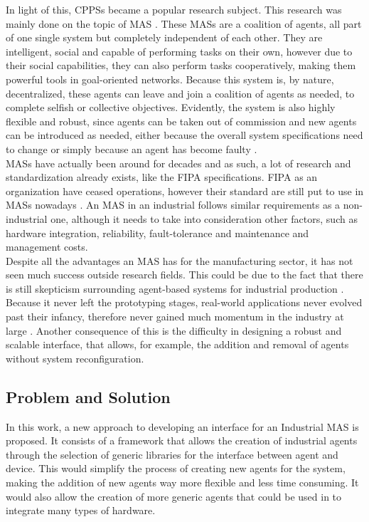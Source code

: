 In light of this, \gls{CPPS}s became a popular research subject. This research was mainly done on the topic of \gls{MAS} \cite{sakurada01} \cite{karnouskos01}. These \gls{MAS}s are a coalition of agents, all part of one single system but completely independent of each other. They are intelligent, social and capable of performing tasks on their own, however due to their social capabilities, they can also perform tasks cooperatively, making them powerful tools in goal-oriented networks. Because this system is, by nature, decentralized, these agents can leave and join a coalition of agents as needed, to complete selfish or collective objectives. Evidently, the system is also highly flexible and robust, since agents can be taken out of commission and new agents can be introduced as needed, either because the overall system specifications need to change or simply because an agent has become faulty \cite{paulo02}. \\

\gls{MAS}s have actually been around for decades and as such, a lot of research and standardization already exists, like the \gls{FIPA} specifications. \gls{FIPA} as an organization have ceased operations, however their standard are still put to use in \gls{MAS}s nowadays \cite{FIPA_website}. An \gls{MAS} in an industrial follows similar requirements as a non-industrial one, although it needs to take into consideration other factors, such as hardware integration, reliability, fault-tolerance and maintenance and management costs.\\

Despite all the advantages an \gls{MAS} has for the manufacturing sector, it has not seen much success outside research fields. This could be due to the fact that there is still skepticism surrounding agent-based systems for industrial production \cite{bottling_plant_part2}. Because it never left the prototyping stages, real-world applications never evolved past their infancy, therefore never gained much momentum in the industry at large \cite{karnouskos02}. Another consequence of this is the difficulty in designing a robust and scalable interface, that allows, for example, the addition and removal of agents without system reconfiguration. %

\subsection{Problem and Solution}

In this work, a new approach to developing an interface for an Industrial \gls{MAS} is proposed. It consists of a framework that allows the creation of industrial agents through the selection of generic libraries for the interface between agent and device. This would simplify the process of creating new agents for the system, making the addition of new agents way more flexible and less time consuming. It would also allow the creation of more generic agents that could be used in to integrate many types of hardware.